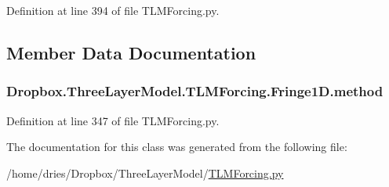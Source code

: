 Definition at line 394 of file T\+L\+M\+Forcing.\+py.



\subsection{Member Data Documentation}
\hypertarget{classDropbox_1_1ThreeLayerModel_1_1TLMForcing_1_1Fringe1D_a064b5ef34070d46ab0ff174a841bfa5b}{
\subsubsection[{method}]{\setlength{\rightskip}{0pt plus 5cm}Dropbox.\+Three\+Layer\+Model.\+T\+L\+M\+Forcing.\+Fringe1\+D.\+method}}\label{classDropbox_1_1ThreeLayerModel_1_1TLMForcing_1_1Fringe1D_a064b5ef34070d46ab0ff174a841bfa5b}


Definition at line 347 of file T\+L\+M\+Forcing.\+py.



The documentation for this class was generated from the following file\+:\begin{DoxyCompactItemize}
\item 
/home/dries/\+Dropbox/\+Three\+Layer\+Model/\hyperlink{TLMForcing_8py}{T\+L\+M\+Forcing.\+py}\end{DoxyCompactItemize}
